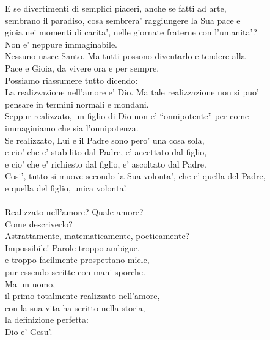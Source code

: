 \begin{haiku}
    E se divertimenti di semplici piaceri, anche se fatti ad arte,\\
    sembrano il paradiso, cosa sembrera' raggiungere la Sua pace e \\
    gioia nei momenti di carita', nelle giornate fraterne con l'umanita'?\\
    Non e' neppure immaginabile.\\
    Nessuno nasce Santo. Ma tutti possono diventarlo e tendere alla\\
    Pace e Gioia, da vivere ora e per sempre.\\
    \leavevmode
    Possiamo riassumere tutto dicendo:
    \\
    La realizzazione nell'amore e' Dio. Ma tale realizzazione non si puo'\\
    pensare in termini normali e mondani.\\ 
    Seppur realizzato, un figlio di Dio non e' ``onnipotente'' per come\\
    immaginiamo che sia l'onnipotenza.\\
    Se realizzato, Lui e il Padre sono pero' una cosa sola, \\
    e cio' che e' stabilito dal Padre, e' accettato dal figlio,\\
    e cio' che e' richiesto dal figlio, e' ascoltato dal Padre.\\
    Cosi', tutto si muove secondo la Sua volonta', che e' quella del Padre,\\
    e quella del figlio, unica volonta'.\\
    \leavevmode\\
    Realizzato nell'amore? Quale amore?\\
    Come descriverlo?\\
    Astrattamente, matematicamente, poeticamente?\\
    Impossibile! Parole troppo ambigue, \\
    e troppo facilmente prospettano miele,\\
    pur essendo scritte con mani sporche.\\
    Ma un uomo, \\
    il primo totalmente realizzato nell'amore,\\
    con la sua vita ha scritto nella storia,\\
    la definizione perfetta:\\
    \hspace{1cm} Dio e' Gesu'.\\

\end{haiku}
